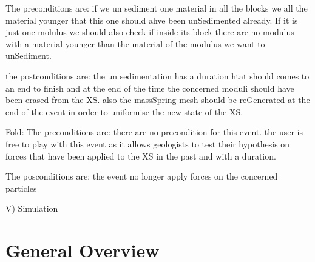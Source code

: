\documentclass[12pt, a4paper]{memoir} %
\begin{document}
	The preconditions are: if we un sediment one material in all the blocks
	we all the material younger that this one should ahve been unSedimented already. If it is just one molulus we should also check if inside its block there are  no modulus with a material younger than the material of the modulus we want to unSediment.
	
	the postconditions are: the un sedimentation has a duration htat should comes to an end to finish and at the end of the time the concerned moduli should have been erased from the XS. also the massSpring mesh should be reGenerated at the end of the event in order to uniformise the new state of the XS.

Fold:
	The preconditions are: there are no precondition for this event. the user is free to play with this event as it allows geologists to test their hypothesis on forces that have been applied to the XS in the past and with a duration.
	
	The posconditions are: the event no longer apply forces on the concerned particles
	


V) Simulation

\section{General Overview}
\end{document}
